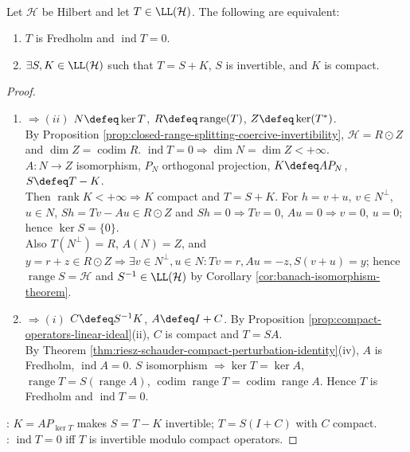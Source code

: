 \begin{theorem} \label{thm:fredholm-index-zero-invertible-plus-compact} \\
Let $\mathcal{H}$ be Hilbert and let $T\in\LL(\mathcal{H})$. The following are equivalent:
\begin{enumerate}[label=(\roman*)]
\setlength{\itemsep}{0pt}
\item $T$ is Fredholm and $\operatorname{ind}T=0$.
\item $\exists S,K\in\LL(\mathcal{H})$ such that $T=S+K$, $S$ is invertible, and $K$ is compact.
\end{enumerate}
\begin{proof}
\begin{enumerate}[label=(\roman*)]
\setlength{\itemsep}{0pt}
\item[$(i)$]$\Rightarrow(ii)$ $N\defeq\ker T$, $R\defeq\operatorname{range}(T)$, $Z\defeq\ker(T^*)$.\\
By Proposition \ref{prop:closed-range-splitting-coercive-invertibility}, $\mathcal{H}=R\odot Z$ and $\dim Z=\operatorname{codim}R$. $\operatorname{ind}T=0\Rightarrow\dim N=\dim Z<+\infty$.\\
$A:N\to Z$ isomorphism, $P_N$ orthogonal projection, $K\defeq AP_N$, $S\defeq T-K$.\\
Then $\operatorname{rank}K<+\infty\Rightarrow K$ compact and $T=S+K$. For $h=v+u$, $v\in N^\perp$, $u\in N$, $Sh=Tv-Au\in R\odot Z$ and $Sh=0\Rightarrow Tv=0$, $Au=0\Rightarrow v=0$, $u=0$; hence $\ker S=\{0\}$.\\
Also $T(N^\perp)=R$, $A(N)=Z$, and $y=r+z\in R\odot Z\Rightarrow\exists v\in N^\perp,u\in N:Tv=r,Au=-z,S(v+u)=y$; hence $\operatorname{range}S=\mathcal{H}$ and $S^{-1}\in\LL(\mathcal{H})$ by Corollary \ref{cor:banach-isomorphism-theorem}.
\item[$(ii)$]$\Rightarrow(i)$ $C\defeq S^{-1}K$, $A\defeq I+C$. By Proposition \ref{prop:compact-operators-linear-ideal}(ii), $C$ is compact and $T=SA$.\\
By Theorem \ref{thm:riesz-schauder-compact-perturbation-identity}(iv), $A$ is Fredholm, $\operatorname{ind}A=0$. $S$ isomorphism $\Rightarrow \ker T=\ker A$, $\operatorname{range}T=S(\operatorname{range}A)$, $\operatorname{codim}\operatorname{range}T=\operatorname{codim}\operatorname{range}A$. Hence $T$ is Fredholm and $\operatorname{ind}T=0$.
\end{enumerate}
: $K=AP_{\ker T}$ makes $S=T-K$ invertible; $T=S(I+C)$ with $C$ compact.\\
: $\operatorname{ind}T=0$ iff $T$ is invertible modulo compact operators.
\end{proof}
\end{theorem}

